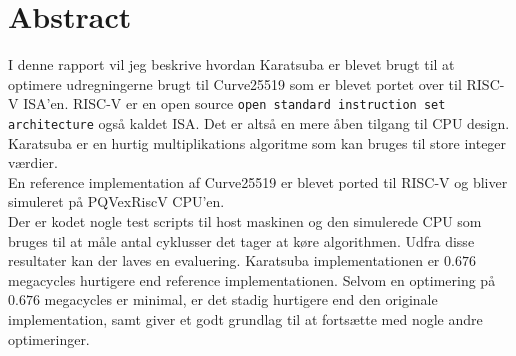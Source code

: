 \section{Abstract}
I denne rapport vil jeg beskrive hvordan Karatsuba er blevet brugt til at optimere udregningerne brugt til Curve25519 som er blevet portet over til RISC-V ISA'en. RISC-V er en open source \texttt{open standard instruction set architecture} også kaldet ISA. Det er altså en mere åben tilgang til CPU design.
\\
Karatsuba er en hurtig multiplikations algoritme som kan bruges til store integer værdier.\\En reference implementation af Curve25519 er blevet ported til RISC-V og bliver simuleret på PQVexRiscV CPU'en.\\Der er kodet nogle test scripts til host maskinen og den simulerede CPU som bruges til at måle antal cyklusser det tager at køre algorithmen.  
Udfra disse resultater kan der laves en evaluering. Karatsuba implementationen er $0.676$ megacycles hurtigere end reference implementationen. Selvom en optimering på $0.676$ megacycles er minimal, er det stadig hurtigere end den originale implementation, samt giver et godt grundlag til at fortsætte med nogle andre optimeringer.
\pagebreak